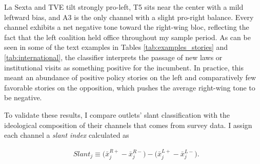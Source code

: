 \documentclass[12pt]{article}
\begin{document}
	La Sexta and TVE tilt strongly pro-left, T5 sits near the center with a mild leftward bias, and A3 is the only channel  with a slight pro-right balance. Every channel exhibits a net negative tone toward the right-wing bloc, reflecting the fact that the left coalition held office throughout my sample period. As can be seen in some of the text examples in Tables \ref{tab:examples_stories} and \ref{tab:international}, the classifier interprets the passage of new laws or institutional visits as something positive for the incumbent. In practice, this meant an abundance of positive policy stories on the left and comparatively few favorable stories on the opposition, which pushes the average right-wing tone to be negative.
	
	
	
	
	
	
	To validate these results, I compare outlets' slant classification with the ideological composition of their channels that comes from survey data. 	I assign each channel a \textit{slant index} calculated as 
	
	
	
	\begin{equation}\label{eq:ideo_index}
		\begin{aligned}
			& Slant_j \equiv \bigl(\bar{x}_j^{R+}-\bar{x}_j^{R-}\bigr)-\bigl(\bar{x}_j^{L+}-\bar{x}_j^{L-}\bigr).
		\end{aligned}
	\end{equation} 
	
	
	
\end{document}

